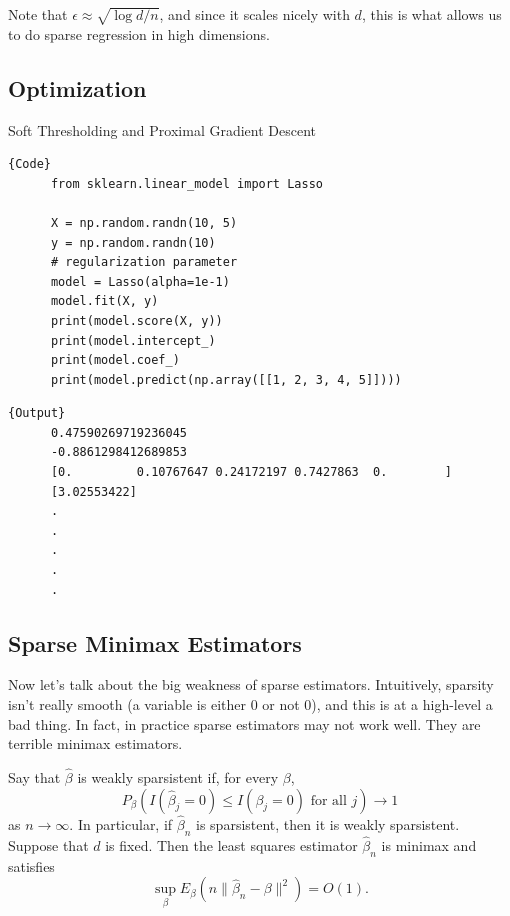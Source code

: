   Note that $\epsilon \approx \sqrt{\log{d}/n}$, and since it scales nicely with $d$, this is what allows us to do sparse regression in high dimensions. 

\subsection{Optimization}

  Soft Thresholding and Proximal Gradient Descent

  \begin{code}
    \noindent\begin{minipage}{.6\textwidth}
    \begin{lstlisting}[]{Code}
      from sklearn.linear_model import Lasso

      X = np.random.randn(10, 5) 
      y = np.random.randn(10)
      # regularization parameter
      model = Lasso(alpha=1e-1)  
      model.fit(X, y) 
      print(model.score(X, y))  
      print(model.intercept_)
      print(model.coef_) 
      print(model.predict(np.array([[1, 2, 3, 4, 5]]))) 
    \end{lstlisting}
    \end{minipage}
    \hfill
    \begin{minipage}{.39\textwidth}
    \begin{lstlisting}[]{Output}
      0.47590269719236045
      -0.8861298412689853
      [0.         0.10767647 0.24172197 0.7427863  0.        ]
      [3.02553422]
      .
      .
      .
      .
      .
    \end{lstlisting}
    \end{minipage}
  \end{code}

\subsection{Sparse Minimax Estimators}

  Now let's talk about the big weakness of sparse estimators. Intuitively, sparsity isn't really smooth (a variable is either $0$ or not $0$), and this is at a high-level a bad thing. In fact, in practice sparse estimators may not work well. They are terrible minimax estimators. 

  Say that $\hat{\beta}$ is weakly sparsistent if, for every $\beta$,
  \begin{equation}
    P_{\beta}(I(\hat{\beta}_j = 0) \leq I(\beta_j = 0) \text{ for all } j) \to 1
  \end{equation}
  as $n \to \infty$. In particular, if $\hat{\beta}_n$ is sparsistent, then it is weakly sparsistent. Suppose that $d$ is fixed. Then the least squares estimator $\hat{\beta}_n$ is minimax and satisfies
  \begin{equation}
    \sup_{\beta} E_{\beta}(n\|\hat{\beta}_n - \beta\|^2) = O(1). 
  \end{equation}

